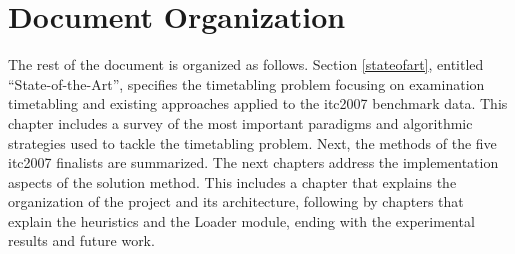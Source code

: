 \section{Document Organization}

The rest of the document is organized as follows. Section \ref{stateofart}, entitled ``State-of-the-Art'', specifies the timetabling problem focusing on examination timetabling and existing approaches applied to the \gls{itc2007} benchmark data. This chapter includes a survey of the most important paradigms and algorithmic strategies used to tackle the timetabling problem. Next, the methods of the five \gls{itc2007} finalists are summarized. The next chapters address the implementation aspects of the solution method. This includes a chapter that explains the organization of the project and its architecture, following by chapters that explain the heuristics and the Loader module, ending with the experimental results and future work.